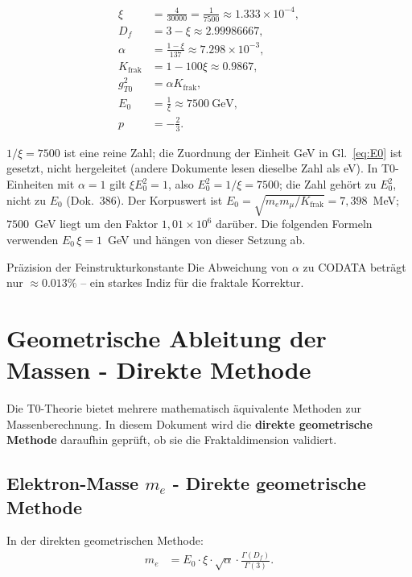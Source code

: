 	\begin{align}
		\xi &= \frac{4}{30000} = \frac{1}{7500} \approx 1.333 \times 10^{-4}, \label{eq:xi} \\
		D_f &= 3 - \xi \approx 2.99986667, \label{eq:Df} \\
		\alpha &= \frac{1 - \xi}{137} \approx 7.298 \times 10^{-3}, \label{eq:alpha} \\
		K_{\text{frak}} &= 1 - 100 \xi \approx 0.9867, \label{eq:K} \\
		g_{T0}^2 &= \alpha K_{\text{frak}}, \label{eq:gT0} \\
		E_0 &= \frac{1}{\xi} \approx \SI{7500}{\giga\electronvolt}, \label{eq:E0} \\
		p &= -\frac{2}{3}. \label{eq:p}
	\end{align}

	$1/\xi = 7500$ ist eine reine Zahl; die Zuordnung der Einheit GeV in Gl.~\eqref{eq:E0} ist gesetzt, nicht hergeleitet (andere Dokumente lesen dieselbe Zahl als eV). In T0-Einheiten mit $\alpha = 1$ gilt $\xi E_0^2 = 1$, also $E_0^2 = 1/\xi = 7500$; die Zahl gehört zu $E_0^2$, nicht zu $E_0$ (Dok.~386). Der Korpuswert ist $E_0 = \sqrt{m_e m_\mu/K_{\text{frak}}} = 7{,}398$~MeV; $7500$~GeV liegt um den Faktor $1{,}01\times10^{6}$ darüber. Die folgenden Formeln verwenden $E_0\,\xi = 1$~GeV und hängen von dieser Setzung ab.
	
	\begin{result}{Präzision der Feinstrukturkonstante}{}
		Die Abweichung von $\alpha$ zu CODATA beträgt nur $\approx 0.013\%$ -- ein starkes Indiz für die fraktale Korrektur.
	\end{result}
	
	\section{Geometrische Ableitung der Massen - Direkte Methode}
	\label{sec:geometrische_ableitung}
	
	Die T0-Theorie bietet mehrere mathematisch äquivalente Methoden zur Massenberechnung. In diesem Dokument wird die \textbf{direkte geometrische Methode} daraufhin geprüft, ob sie die Fraktaldimension validiert.
	
	\subsection{Elektron-Masse $m_e$ - Direkte geometrische Methode}
	\label{subsec:elektron_masse}
	
	In der direkten geometrischen Methode:
	\begin{align}
		m_e &= E_0 \cdot \xi \cdot \sqrt{\alpha} \cdot \frac{\Gamma(D_f)}{\Gamma(3)}. \label{eq:me_direct}
	\end{align}

